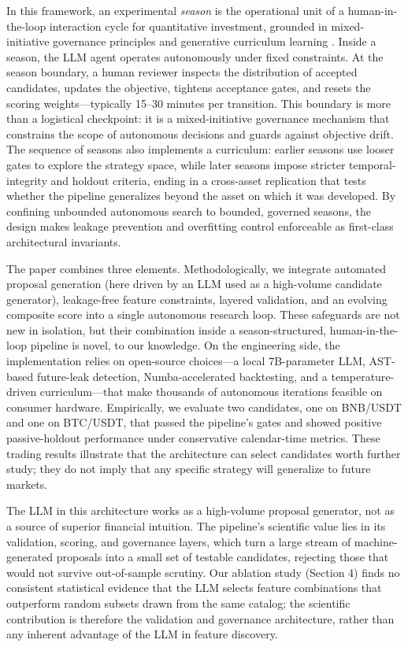 \documentclass[11pt,a4paper]{article}
\begin{document}
In this framework, an experimental \emph{season} is the operational unit of a human-in-the-loop interaction cycle for quantitative investment, grounded in mixed-initiative governance principles \citep{horvitz_1999, amershi_2019} and generative curriculum learning \citep{bengio_2009}. Inside a season, the LLM agent operates autonomously under fixed constraints. At the season boundary, a human reviewer inspects the distribution of accepted candidates, updates the objective, tightens acceptance gates, and resets the scoring weights---typically 15--30 minutes per transition. This boundary is more than a logistical checkpoint: it is a mixed-initiative governance mechanism that constrains the scope of autonomous decisions and guards against objective drift. The sequence of seasons also implements a curriculum: earlier seasons use looser gates to explore the strategy space, while later seasons impose stricter temporal-integrity and holdout criteria, ending in a cross-asset replication that tests whether the pipeline generalizes beyond the asset on which it was developed. By confining unbounded autonomous search to bounded, governed seasons, the design makes leakage prevention and overfitting control enforceable as first-class architectural invariants.

The paper combines three elements. Methodologically, we integrate automated proposal generation (here driven by an LLM used as a high-volume candidate generator), leakage-free feature constraints, layered validation, and an evolving composite score into a single autonomous research loop. These safeguards are not new in isolation, but their combination inside a season-structured, human-in-the-loop pipeline is novel, to our knowledge. On the engineering side, the implementation relies on open-source choices---a local 7B-parameter LLM, AST-based future-leak detection, Numba-accelerated backtesting, and a temperature-driven curriculum---that make thousands of autonomous iterations feasible on consumer hardware. Empirically, we evaluate two candidates, one on BNB/USDT and one on BTC/USDT, that passed the pipeline's gates and showed positive passive-holdout performance under conservative calendar-time metrics. These trading results illustrate that the architecture can select candidates worth further study; they do not imply that any specific strategy will generalize to future markets.

The LLM in this architecture works as a high-volume proposal generator, not as a source of superior financial intuition. The pipeline's scientific value lies in its validation, scoring, and governance layers, which turn a large stream of machine-generated proposals into a small set of testable candidates, rejecting those that would not survive out-of-sample scrutiny. Our ablation study (Section 4) finds no consistent statistical evidence that the LLM selects feature combinations that outperform random subsets drawn from the same catalog; the scientific contribution is therefore the validation and governance architecture, rather than any inherent advantage of the LLM in feature discovery.
\end{document}
